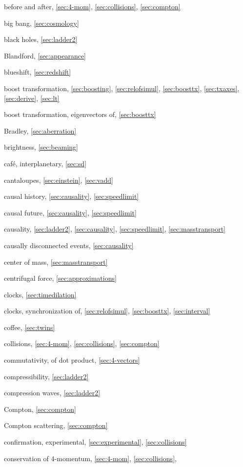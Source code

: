 \begin{theindex}
\item before and after, \ref{sec:4-mom}, \ref{sec:collisions},
	\ref{sec:compton}
\item big bang, \ref{sec:cosmology}
\item black holes, \ref{sec:ladder2}
\item Blandford, \ref{sec:appearance}
\item blueshift, \ref{sec:redshift}
\item boost transformation, \ref{sec:boosting}, \ref{sec:relofsimul},
	\ref{sec:boosttx}, \ref{sec:txaxes}, \ref{sec:derive}, \ref{sec:lt}
\item boost transformation, eigenvectors of, \ref{sec:boosttx}
\item Bradley, \ref{sec:aberration}
\item brightness, \ref{sec:beaming}
\item caf\'e, interplanetary, \ref{sec:sd}
\item cantaloupes, \ref{sec:einstein}, \ref{sec:vadd}
\item causal history, \ref{sec:causality}, \ref{sec:speedlimit}
\item causal future, \ref{sec:causality}, \ref{sec:speedlimit}
\item causality, \ref{sec:ladder2}, \ref{sec:causality},
	\ref{sec:speedlimit}, \ref{sec:masstransport}
\item causally disconnected events, \ref{sec:causality}
\item center of mass, \ref{sec:masstransport}
\item centrifugal force, \ref{sec:approximations}
\item clocks, \ref{sec:timedilation}
\item clocks, synchronization of, \ref{sec:relofsimul}, \ref{sec:boosttx},
	\ref{sec:interval}
\item coffee, \ref{sec:twins}
\item collisions, \ref{sec:4-mom}, \ref{sec:collisions}, \ref{sec:compton}
\item commutativity, of dot product, \ref{sec:4-vectors}
\item compressibility, \ref{sec:ladder2}
\item compression waves, \ref{sec:ladder2}
\item Compton, \ref{sec:compton}
\item Compton scattering, \ref{sec:compton}
\item confirmation, experimental, \ref{sec:experimental},
	\ref{sec:collisions}
\item conservation of 4-momentum, \ref{sec:4-mom}, \ref{sec:collisions},

\end{theindex}
